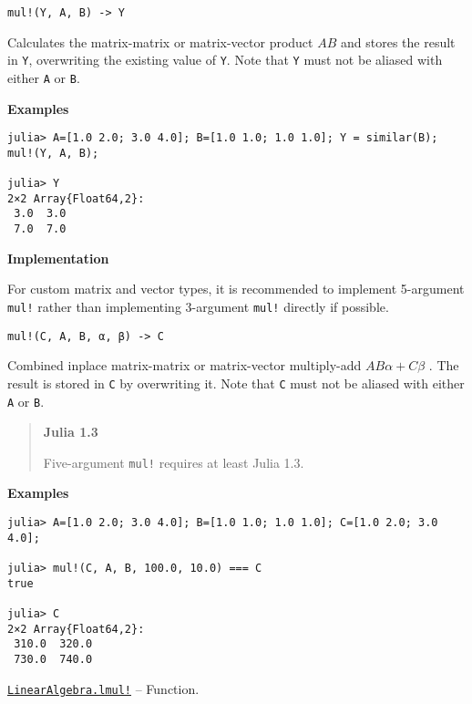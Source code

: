 \begin{adjustwidth}{2em}{0pt}


\begin{verbatim}
mul!(Y, A, B) -> Y
\end{verbatim}

Calculates the matrix-matrix or matrix-vector product  \(AB\)  and stores the result in \texttt{Y}, overwriting the existing value of \texttt{Y}. Note that \texttt{Y} must not be aliased with either \texttt{A} or \texttt{B}.

\textbf{Examples}


\begin{verbatim}
julia> A=[1.0 2.0; 3.0 4.0]; B=[1.0 1.0; 1.0 1.0]; Y = similar(B); mul!(Y, A, B);

julia> Y
2×2 Array{Float64,2}:
 3.0  3.0
 7.0  7.0
\end{verbatim}

\textbf{Implementation}

For custom matrix and vector types, it is recommended to implement 5-argument \texttt{mul!} rather than implementing 3-argument \texttt{mul!} directly if possible.




\begin{lstlisting}
mul!(C, A, B, α, β) -> C
\end{lstlisting}

Combined inplace matrix-matrix or matrix-vector multiply-add  \(A B α + C β\) . The result is stored in \texttt{C} by overwriting it.  Note that \texttt{C} must not be aliased with either \texttt{A} or \texttt{B}.

\begin{quote}
\textbf{Julia 1.3}

Five-argument \texttt{mul!} requires at least Julia 1.3.

\end{quote}
\textbf{Examples}


\begin{verbatim}
julia> A=[1.0 2.0; 3.0 4.0]; B=[1.0 1.0; 1.0 1.0]; C=[1.0 2.0; 3.0 4.0];

julia> mul!(C, A, B, 100.0, 10.0) === C
true

julia> C
2×2 Array{Float64,2}:
 310.0  320.0
 730.0  740.0
\end{verbatim}



\end{adjustwidth}
\hypertarget{12404459690324241452}{} 
\hyperlink{12404459690324241452}{\texttt{LinearAlgebra.lmul!}}  -- {Function.}


